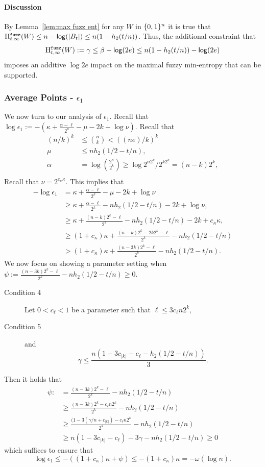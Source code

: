 \paragraph{Discussion}
By Lemma~\ref{lem:max fuzz ent} for any $W$ in $\{0, 1\}^n$ it is true that $\mathrm{H}^{\mathtt{fuzz}}_{t,\infty}(W) \le n -\mathsf{log}\!\left(|B_t|\right) \le n(1-h_2(t/n))$.  Thus, the additional constraint that 
\[
\mathrm{H}^{\mathtt{fuzz}}_{t,\infty}(W):=\gamma \le \beta - \mathsf{log}\!\left(2e\right)
\le n(1-h_2(t/n)) - \mathsf{log}\!\left(2e\right)\] imposes an additive $\log{2e}$ impact on the maximal fuzzy min-entropy that can be supported. 


\subsubsection{Average Points - $\epsilon_1$} 
We now turn to our analysis of $\epsilon_1$.  Recall that $\log{\epsilon_1}:= -\left(\kappa+\frac{\alpha -\ell}{2^k} - \mu -2k+\log{\nu}\right).$
Recall that 
\begin{align*}
(n/k)^k &\le {n\choose k} < ((ne)/k)^k\\
\mu&\le nh_2(1/2-t/n),\\
\alpha &= \log{2^n\choose 2^k} \ge \log{2^{n2^k} /2^{k2^k}} = (n-k)2^k,\\
\end{align*}
Recall that $\nu = 2^{c_\kappa \kappa}$.
This implies that 
\begin{align*}
-\log{\epsilon_1}&= \kappa+\frac{\alpha-\ell}{2^k} - \mu -2k+\log{\nu}\\
&\ge  \kappa+\frac{\alpha -\ell}{2^k} - nh_2(1/2-t/n) - 2k+\log{\nu},\\
&\ge  \kappa+\frac{(n-k)2^k-\ell}{2^k} - nh_2(1/2-t/n) - 2k+c_{\kappa}\kappa,\\
&\ge  (1+c_{\kappa})\kappa+\frac{(n-k)2^k-2k2^{k}-\ell}{2^k} - nh_2(1/2-t/n)\\
&>  (1+c_{\kappa})\kappa+\frac{(n-3k)2^k-\ell}{2^k} - nh_2(1/2-t/n) .
\end{align*}
\noindent
We now focus on showing a parameter setting when $\psi:=\frac{(n-3k)2^k-\ell}{2^k} - nh_2(1/2-t/n)\ge 0$.
\begin{description}
\item[Condition 4]
Let $0< c_\ell<1$ be a parameter such that 
$
\ell\le 3c_{\ell} n2^k,$
\item[Condition 5] 
and 
\[
\gamma \le \frac{n(1-3c_{|k|} -c_{\ell}- h_2(1/2-t/n))}{3}.
\]
\end{description}
\noindent
Then it holds that 
\begin{align*}
\psi:&=\frac{(n-3k)2^k-\ell}{2^k} - nh_2(1/2-t/n) \\
&\ge   \frac{(n-3k)2^k-c_{\ell}n2^k}{2^k} - nh_2(1/2-t/n)\\
&\ge   \frac{(1-3(\gamma/n+c_{|k|}) -c_{\ell}n2^k}{2^k} - nh_2(1/2-t/n)\\
&\ge n(1-3c_{|k|}-c_{\ell}) - 3\gamma - nh_2(1/2-t/n) \ge 0
\end{align*}
which suffices to ensure that 
\[
\log{\epsilon_1} \le  -\left((1+c_{\kappa})\kappa+\psi \right) \le  -(1+c_{\kappa})\kappa = -\omega(\log{n}).
\]
